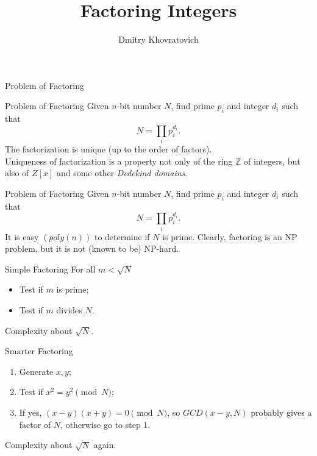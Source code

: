 \documentclass[t]{beamer}
\author{Dmitry Khovratovich}
\institute{Ethereum Foundation}
\title{Factoring Integers}
\begin{document}
    
\maketitle

\begin{frame}[c]
\begin{center}
    \Large{Problem of Factoring}
    \end{center}
\end{frame}

\begin{frame}{Problem of Factoring}
    Given $n$-bit number $N$, find prime $p_i$ and integer $d_i$ such that
    $$
    N = \prod_i p_i^{d_i}.
    $$
    The factorization is unique (up to the order of factors).\\[10pt]
    
    \pause Uniqueness of factorization is a property not only of the ring $\mathbb{Z}$ of integers, but also of $Z[x]$ and some other \emph{Dedekind domains}. %
    
\end{frame}

\begin{frame}{Problem of Factoring}
    Given $n$-bit number $N$, find prime $p_i$ and integer $d_i$ such that
    $$
    N = \prod_i p_i^{d_i}.
    $$
   It is easy $(poly(n))$ to determine if $N$ is prime. Clearly, factoring is an NP problem, but it is not (known to be) NP-hard.
    
\end{frame}

\begin{frame}{Simple Factoring}
    For all $m<\sqrt{N}$
    \begin{itemize}
        \item Test if $m$ is prime;
        \item Test if $m$ divides $N$.
    \end{itemize}
    Complexity about $\sqrt{N}$.
    
\end{frame}

\begin{frame}{Smarter Factoring}
\begin{enumerate}
    \item Generate $x,y$;
    \item Test if $x^2 = y^2 \pmod{N}$;
    \item If yes, $(x-y)(x+y)=0\pmod{N}$, so  $GCD(x-y,N)$ probably gives a factor of $N$, otherwise go to step 1.
    
\end{enumerate}
    
    Complexity about $\sqrt{N}$ again.
\end{frame}
\end{document}
